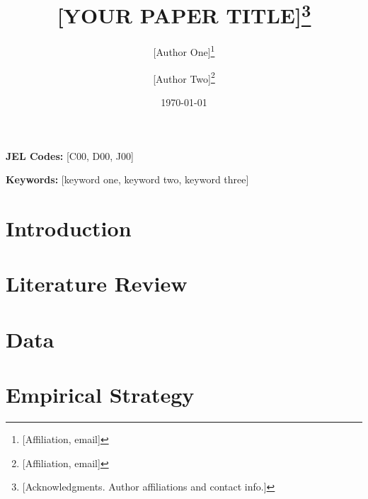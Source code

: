 \documentclass[12pt]{article}
\title{[YOUR PAPER TITLE]\thanks{[Acknowledgments. Author affiliations and contact info.]}}
\author{
    [Author One]\thanks{[Affiliation, email]} \and
    [Author Two]\thanks{[Affiliation, email]}
}
\date{\today}
\theoremstyle{definition}
\begin{document}
\maketitle

\begin{abstract}
\end{abstract}

\medskip

\noindent\textbf{JEL Codes:} [C00, D00, J00]

\noindent\textbf{Keywords:} [keyword one, keyword two, keyword three]

\newpage

\section{Introduction}\label{sec:introduction}



\section{Literature Review}\label{sec:literature}


\section{Data}\label{sec:data}


% 


\section{Empirical Strategy}\label{sec:identification}
\end{document}
